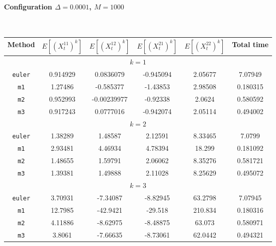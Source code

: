 \paragraph*{Configuration $\Delta=0.0001$, $M=1000$}\hfill\\
\begin{tabular}{@{}*{6}{c}@{}}
Method & $E[(X^{11}_t)^k]$ & $E[(X^{12}_t)^k]$ & $E[(X^{21}_t)^k]$ & $E[(X^{22}_t)^k]$ & Total time\\
\hline
\multicolumn{6}{c}{$k=1$}\\
\verb+euler+ & 0.914929 & 0.0836079 & -0.945094 & 2.05677 & 7.07949 \\
 \verb+m1+ & 1.27486 & -0.585377 & -1.43853 & 2.98508 & 0.180315 \\
 \verb+m2+ & 0.952993 & -0.00239977 & -0.92338 & 2.0624 & 0.580592 \\
 \verb+m3+ & 0.917243 & 0.0777016 & -0.942074 & 2.05114 & 0.494002 \\
\hline
\multicolumn{6}{c}{$k=2$}\\
\verb+euler+ & 1.38289 & 1.48587 & 2.12591 & 8.33465 & 7.0799 \\
 \verb+m1+ & 2.93481 & 4.46934 & 4.78394 & 18.299 & 0.181092 \\
 \verb+m2+ & 1.48655 & 1.59791 & 2.06062 & 8.35276 & 0.581721 \\
 \verb+m3+ & 1.39381 & 1.49888 & 2.11028 & 8.25629 & 0.495072 \\
\hline
\multicolumn{6}{c}{$k=3$}\\
\verb+euler+ & 3.70931 & -7.34087 & -8.82945 & 63.2798 & 7.07945 \\
 \verb+m1+ & 12.7985 & -42.9421 & -29.518 & 210.834 & 0.180316 \\
 \verb+m2+ & 4.11886 & -8.62975 & -8.48875 & 63.073 & 0.580971 \\
 \verb+m3+ & 3.8061 & -7.66635 & -8.73061 & 62.0442 & 0.494321 
\end{tabular}\hfill\\
